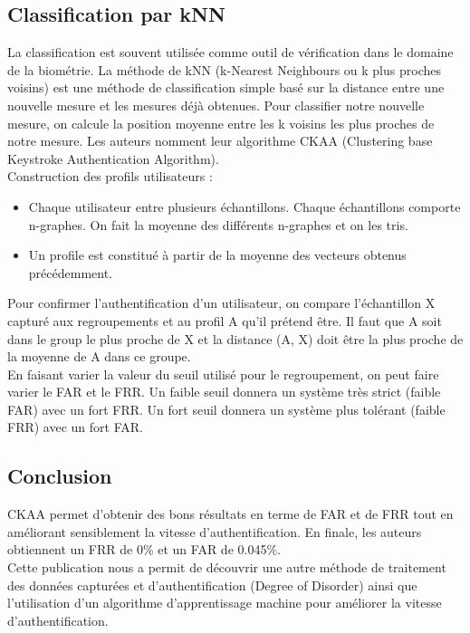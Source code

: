\subsection{Classification par kNN}

La classification est souvent utilisée comme outil de vérification dans le domaine de la biométrie. La méthode de kNN (k-Nearest Neighbours ou k plus proches voisins) est une méthode de classification simple basé sur la distance entre une nouvelle mesure et les mesures déjà obtenues. Pour classifier notre nouvelle mesure, on calcule la position moyenne entre les k voisins les plus proches de notre mesure. Les auteurs nomment leur algorithme CKAA (Clustering base Keystroke Authentication Algorithm).\\

Construction des profils utilisateurs :\\

\begin{itemize}
  \item Chaque utilisateur entre plusieurs échantillons. Chaque échantillons comporte n-graphes. On fait la moyenne des différents n-graphes et on les tris.
  \item Un profile est constitué à partir de la moyenne des vecteurs obtenus précédemment.\\
\end{itemize}

Pour confirmer l'authentification d'un utilisateur, on compare l'échantillon X capturé aux regroupements et au profil A qu'il prétend être. Il faut que A soit dans le group le plus proche de X et la distance (A, X) doit être la plus proche de la moyenne de A dans ce groupe.\\

En faisant varier la valeur du seuil utilisé pour le regroupement, on peut faire varier le FAR et le FRR. Un faible seuil donnera un système très strict (faible FAR) avec un fort FRR. Un fort seuil donnera un système plus tolérant (faible FRR) avec un fort FAR.

\subsection{Conclusion}

CKAA permet d'obtenir des bons résultats en terme de FAR et de FRR tout en améliorant sensiblement la vitesse d'authentification. En finale, les auteurs obtiennent un FRR de 0\% et un FAR de 0.045\%.\\

Cette publication nous a permit de découvrir une autre méthode de traitement des données capturées et d'authentification (Degree of Disorder) ainsi que l'utilisation d'un algorithme d'apprentissage machine pour améliorer la vitesse d'authentification.
